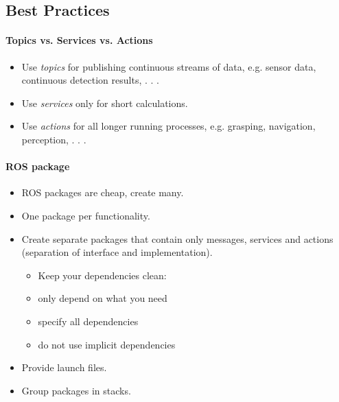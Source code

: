 \subsection{Best Practices}
\paragraph{Topics vs. Services vs. Actions}
\begin{itemize}
\item Use \textit{topics} for publishing continuous streams of data, e.g. sensor data, continuous detection results, . . .\\
\item Use \textit{services} only for short calculations.\\
\item Use \textit{actions} for all longer running processes, e.g. grasping, navigation, perception, . . .
\end{itemize}


\paragraph{ROS package}
\begin{itemize}
\item ROS packages are cheap, create many.
\item One package per functionality.
\item Create separate packages that contain only messages, services and
actions (separation of interface and implementation).
\begin{itemize}
\item Keep your dependencies clean:
\item only depend on what you need
\item specify all dependencies 
\item do not use implicit dependencies
\end{itemize}
\item Provide launch files.
\item Group packages in stacks.
\end{itemize}



